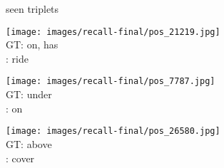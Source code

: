 \documentclass[10pt,twocolumn,letterpaper]{article}
\begin{document}
\begin{figure*}[t]
	\begin{minipage}[b]{0.005\textwidth}
    	\centering
    	\begin{turn}{90}
    	seen triplets
    	\end{turn}
    	\vspace{3.5ex}
    \end{minipage}
    \hspace{0.01\textwidth}
    \begin{minipage}[b]{0.18\textwidth}
    	\centering
       	\texttt{[image: images/recall-final/pos\_21219.jpg]}\\
       	\small{
       	\vspace{0.2ex}
       	GT: on, has\\
       	\cite{Lu16}: ride
       	}
       	\vspace{0.3ex}
    \end{minipage}
    \hspace{0.005\textwidth}
    \begin{minipage}[b]{0.18\textwidth}
       \centering
       \texttt{[image: images/recall-final/pos\_7787.jpg]}\\
       \vspace{0.2ex}
       \small{
       GT: under\\
       \cite{Lu16}: on
       }
       \vspace{0.3ex}
    \end{minipage}
    \hspace{0.005\textwidth}
    \begin{minipage}[b]{0.18\textwidth}
    	\centering
       	\texttt{[image: images/recall-final/pos\_26580.jpg]}\\
       	\vspace{0.2ex}
       	\small{
       	GT: above\\
       	\cite{Lu16}: cover
       	}
       	\vspace{0.3ex}
    \end{minipage}
    \hspace{0.005\textwidth}

\end{figure*}
\end{document}
